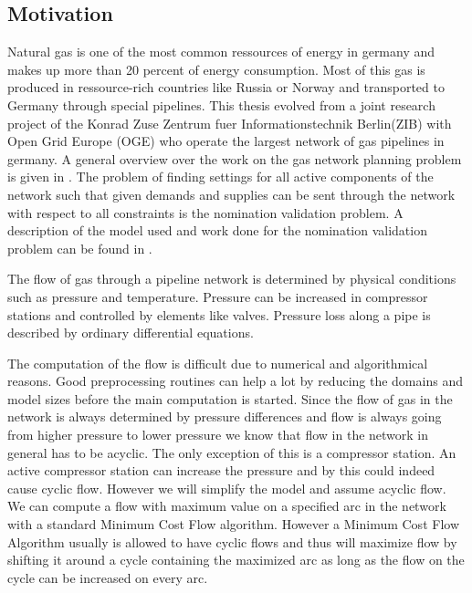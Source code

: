 \subsection{Motivation}
Natural gas is one of the most common ressources of energy in germany and makes up more than 20 percent of energy 
consumption. Most of this gas is produced in ressource-rich countries like Russia or Norway and transported to Germany 
through special pipelines. 
This thesis evolved from a joint research project of the Konrad Zuse Zentrum fuer Informationstechnik Berlin(ZIB) with 
Open Grid Europe (OGE) who operate the largest network of gas pipelines in germany. 
A general overview over the work on the gas network planning problem is given in 
\cite{FuegenschuhGeisslerGollmeretal.2013}. The problem of finding settings for all active components of the network 
such that given demands and supplies can be sent through the network with respect to all constraints is the nomination 
validation problem. A description of the model used and work done for the nomination validation problem can be 
found in \cite{PfetschFuegenschuhGeissleretal.2012}. 

The flow of gas through a pipeline network is determined by physical conditions such as pressure and temperature. 
Pressure can be increased in compressor stations and controlled by elements like valves. Pressure loss along a pipe is 
described by ordinary differential equations. 

The computation of the flow is difficult due to numerical and algorithmical reasons. Good preprocessing 
routines can help a lot by reducing the domains and model sizes before the main computation is started.
Since the flow of gas in the network is always determined by pressure differences and flow is always going from higher 
pressure to lower pressure we know that flow in the network in general has to be acyclic. The only exception of this 
is a compressor station. An active compressor station can increase the pressure and by this could indeed cause cyclic 
flow. However we will simplify the model and assume acyclic flow. 
We can compute a flow with 
maximum value on a specified arc in the network with a standard Minimum Cost Flow algorithm. 
However a Minimum Cost Flow Algorithm usually is allowed to have cyclic flows and thus will maximize flow by shifting 
it around a cycle containing the maximized arc as long as the flow on the cycle can be increased on every arc. 

